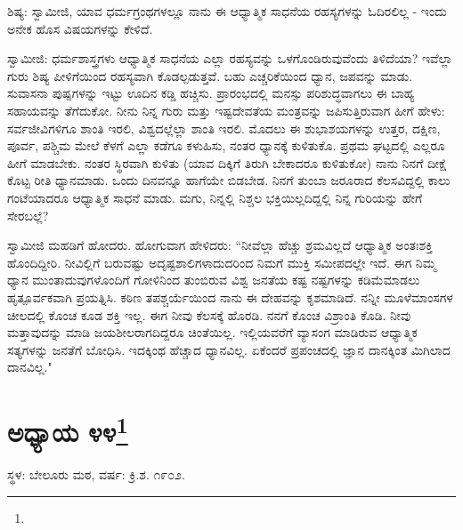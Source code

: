 ಶಿಷ್ಯ: ಸ್ವಾಮೀಜಿ, ಯಾವ ಧರ್ಮಗ್ರಂಥಗಳಲ್ಲೂ ನಾನು ಈ ಆಧ್ಯಾತ್ಮಿಕ ಸಾಧನೆಯ ರಹಸ್ಯಗಳನ್ನು ಓದಿರಲಿಲ್ಲ - ಇಂದು ಅನೇಕ ಹೊಸ ವಿಷಯಗಳನ್ನು ಕೇಳಿದೆ.

ಸ್ವಾಮೀಜಿ: ಧರ್ಮಶಾಸ್ತ್ರಗಳು ಆಧ್ಯಾತ್ಮಿಕ ಸಾಧನೆಯ ಎಲ್ಲಾ ರಹಸ್ಯವನ್ನು ಒಳಗೊಂಡಿರುವುವೆಂದು ತಿಳಿದೆಯಾ? ಇವೆಲ್ಲಾ ಗುರು ಶಿಷ್ಯ ಪೀಳಿಗೆಯಿಂದ ರಹಸ್ಯವಾಗಿ ಕೊಡಲ್ಪಡುತ್ತವೆ. ಬಹು ಎಚ್ಚರಿಕೆಯಿಂದ ಧ್ಯಾನ, ಜಪವನ್ನು ಮಾಡು. ಸುವಾಸನಾ ಪುಷ್ಪಗಳನ್ನು ಇಟ್ಟು ಊದಿನ ಕಡ್ಡಿ ಹಚ್ಚಿಸು. ಪ್ರಾರಂಭದಲ್ಲಿ ಮನಸ್ಸು ಪರಿಶುದ್ಧವಾಗಲು ಈ ಬಾಹ್ಯ ಸಹಾಯವನ್ನು ತೆಗೆದುಕೋ. ನೀನು ನಿನ್ನ ಗುರು ಮತ್ತು ಇಷ್ಟದೇವತೆಯ ಮಂತ್ರವನ್ನು ಜಪಿಸುತ್ತಿರುವಾಗ ಹೀಗೆ ಹೇಳು: ಸರ್ವಜೀವಿಗಳಿಗೂ ಶಾಂತಿ ಇರಲಿ, ವಿಶ್ವದಲ್ಲೆಲ್ಲಾ ಶಾಂತಿ ಇರಲಿ. ಮೊದಲು ಈ ಶುಭಾಶಯಗಳನ್ನು ಉತ್ತರ, ದಕ್ಷಿಣ, ಪೂರ್ವ, ಪಶ್ಚಿಮ ಮೇಲೆ ಕೆಳಗೆ ಎಲ್ಲಾ ಕಡೆಗೂ ಕಳುಹಿಸು, ನಂತರ ಧ್ಯಾನಕ್ಕೆ ಕುಳಿತುಕೊ. ಪ್ರಥಮ ಘಟ್ಟದಲ್ಲಿ ಎಲ್ಲರೂ ಹೀಗೆ ಮಾಡಬೇಕು. ನಂತರ ಸ್ಥಿರವಾಗಿ ಕುಳಿತು (ಯಾವ ದಿಕ್ಕಿಗೆ ತಿರುಗಿ ಬೇಕಾದರೂ ಕುಳಿತುಕೋ) ನಾನು ನಿನಗೆ ದೀಕ್ಷೆ ಕೊಟ್ಟ ರೀತಿ ಧ್ಯಾನಮಾಡು. ಒಂದು ದಿನವನ್ನೂ ಹಾಗೆಯೇ ಬಿಡಬೇಡ. ನಿನಗೆ ತುಂಬಾ ಜರೂರಾದ ಕೆಲಸವಿದ್ದಲ್ಲಿ ಕಾಲು ಗಂಟೆಯಾದರೂ ಆಧ್ಯಾತ್ಮಿಕ ಸಾಧನೆ ಮಾಡು. ಮಗು, ನಿನ್ನಲ್ಲಿ ನಿಶ್ಚಲ ಭಕ್ತಿಯಿಲ್ಲದಿದ್ದಲ್ಲಿ ನಿನ್ನ ಗುರಿಯನ್ನು ಹೇಗೆ ಸೇರಬಲ್ಲೆ?

ಸ್ವಾಮೀಜಿ ಮಹಡಿಗೆ ಹೋದರು. ಹೋಗುವಾಗ ಹೇಳಿದರು: “ನೀವೆಲ್ಲಾ ಹೆಚ್ಚು ಶ್ರಮವಿಲ್ಲದೆ ಆಧ್ಯಾತ್ಮಿಕ ಅಂತಃಶಕ್ತಿ ಹೊಂದಿದ್ದೀರಿ. ನೀವಿಲ್ಲಿಗೆ ಬರುವಷ್ಟು ಅದೃಷ್ಟಶಾಲಿಗಳಾದುದರಿಂದ ನಿಮಗೆ ಮುಕ್ತಿ ಸಮೀಪದಲ್ಲೇ ಇದೆ. ಈಗ ನಿಮ್ಮ ಧ್ಯಾನ ಮುಂತಾದುವುಗಳೊಂದಿಗೆ ಗೋಳಿನಿಂದ ತುಂಬಿರುವ ವಿಶ್ವ ಜನತೆಯ ಕಷ್ಟ ನಷ್ಟಗಳನ್ನು ಕಡಿಮೆಮಾಡಲು ಹೃತ್ಪೂರ್ವಕವಾಗಿ ಪ್ರಯತ್ನಿಸಿ. ಕಠಿಣ ತಪಶ್ಚರ್ಯೆಯಿಂದ ನಾನು ಈ ದೇಹವನ್ನು ಕೃಶಮಾಡಿದೆ. ನನ್ನೀ ಮೂಳೆಮಾಂಸಗಳ ಚೀಲದಲ್ಲಿ ಕೊಂಚ ಕೂಡ ಶಕ್ತಿ ಇಲ್ಲ. ಈಗ ನೀವು ಕೆಲಸಕ್ಕೆ ಹೊರಡಿ. ನನಗೆ ಕೊಂಚ ವಿಶ್ರಾಂತಿ ಕೊಡಿ. ನೀವು ಮತ್ತಾವುದನ್ನು ಮಾಡಿ ಜಯಶೀಲರಾಗದಿದ್ದರೂ ಚಿಂತೆಯಿಲ್ಲ. ಇಲ್ಲಿಯವರೆಗೆ ವ್ಯಾಸಂಗ ಮಾಡಿರುವ ಆಧ್ಯಾತ್ಮಿಕ ಸತ್ಯಗಳನ್ನು ಜನತೆಗೆ ಬೋಧಿಸಿ. ಇದಕ್ಕಿಂಥ ಹೆಚ್ಚಾದ ಧ್ಯಾನವಿಲ್ಲ. ಏಕೆಂದರೆ ಪ್ರಪಂಚದಲ್ಲಿ ಜ್ಞಾನ ದಾನಕ್ಕಿಂತ ಮಿಗಿಲಾದ ದಾನವಿಲ್ಲ."

\newpage

\chapter[ಅಧ್ಯಾಯ ೪೪]{ಅಧ್ಯಾಯ ೪೪\protect\footnote{}}

\begin{center}
ಸ್ಥಳ: ಬೇಲೂರು ಮಠ, ವರ್ಷ: ಕ್ರಿ.ಶ. ೧೯೦೨.
\end{center}


